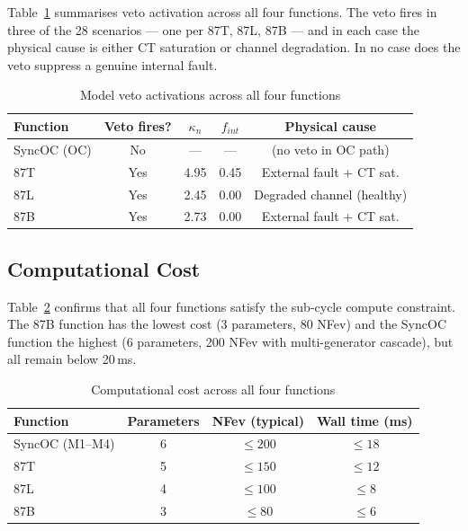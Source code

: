 \documentclass[journal,twoside,10pt]{IEEEtran}
\begin{document}
Table~\ref{tab:veto_summary} summarises veto activation across all
four functions.
The veto fires in three of the 28 scenarios — one per 87T, 87L, 87B —
and in each case the physical cause is either CT saturation or channel
degradation.
In no case does the veto suppress a genuine internal fault.

\begin{table}[!t]
  \renewcommand{\arraystretch}{1.15}
  \caption{Model veto activations across all four functions}
  \label{tab:veto_summary}
  \centering
  \small
  \begin{tabular}{lcccc}
    \toprule
    Function & Veto fires? & $\kappa_n$ & $f_{int}$ & Physical cause \\
    \midrule
    SyncOC (OC) & No  & ---  & ---  & (no veto in OC path) \\
    87T  & Yes & 4.95 & 0.45 & External fault + CT sat. \\
    87L  & Yes & 2.45 & 0.00 & Degraded channel (healthy) \\
    87B  & Yes & 2.73 & 0.00 & External fault + CT sat. \\
    \bottomrule
  \end{tabular}
\end{table}

\subsection{Computational Cost}
\label{sec:comparison:compute}

Table~\ref{tab:compute} confirms that all four functions satisfy the
sub-cycle compute constraint.
The 87B function has the lowest cost (3 parameters, 80 NFev)
and the SyncOC function the highest (6 parameters, 200 NFev with
multi-generator cascade), but all remain below 20\,ms.

\begin{table}[!t]
  \renewcommand{\arraystretch}{1.15}
  \caption{Computational cost across all four functions}
  \label{tab:compute}
  \centering
  \begin{tabular}{lccc}
    \toprule
    Function & Parameters & NFev (typical) & Wall time (ms) \\
    \midrule
    SyncOC (M1--M4) & 6 & $\leq 200$ & $\leq 18$ \\
    87T             & 5 & $\leq 150$ & $\leq 12$ \\
    87L             & 4 & $\leq 100$ & $\leq 8$  \\
    87B             & 3 & $\leq 80$  & $\leq 6$  \\
    \bottomrule
  \end{tabular}
\end{table}
\end{document}
